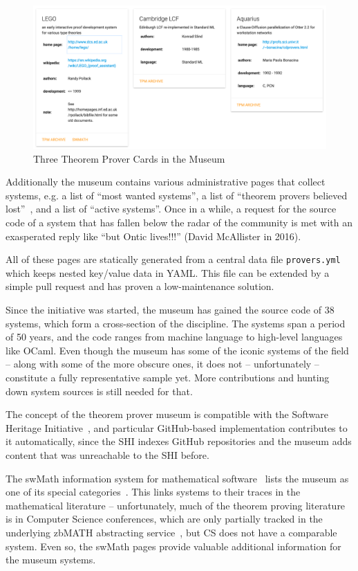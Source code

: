 \documentclass[smallcondensed]{svjour3}
\begin{document}
\begin{figure}[ht]\centering
  \includegraphics[width=\textwidth]{cards}
  \caption{Three Theorem Prover Cards in the Museum}\label{fig:cards}
\end{figure}

Additionally the museum contains various administrative pages that collect systems, e.g. a
list of ``most wanted systems'', a list of ``theorem provers believed
lost''~\cite{tpmuseum:tpbl:on}, and a list of ``active systems''. Once in a while, a
request for the source code of a system that has fallen below the radar of the community
is met with an exasperated reply like ``but Ontic lives!!!'' (David McAllister in
2016).

All of these pages are statically generated from a central data
file \texttt{provers.yml} \cite{tpmuseum:data:on} which keeps nested key/value data in
YAML. This file can be extended by a simple pull request and has proven a low-maintenance
solution. 
    
Since the initiative was started, the museum has gained the source code of 38 systems,
which form a cross-section of the discipline. The systems span a period of 50 years, and
the code ranges from machine language to high-level languages like OCaml. Even though the
museum has some of the iconic systems of the field -- along with some of the more obscure
ones, it does not -- unfortunately -- constitute a fully representative sample yet. More
contributions and hunting down system sources is still needed for that.

The concept of the theorem prover museum is compatible with the Software Heritage
Initiative~\cite{SoftwareHeritage:on}, and particular GitHub-based implementation
contributes to it automatically, since the SHI indexes GitHub repositories and the museum
adds content that was unreachable to the SHI before. 


The \textsf{swMath} information system for mathematical software~\cite{swMath:on} lists
the museum as one of its special categories~\cite{swMath:tpmuseum:on}. This links systems
to their traces in the mathematical literature -- unfortunately, much of the theorem
proving literature is in Computer Science conferences, which are only partially tracked in
the underlying \textsf{zbMATH} abstracting service~\cite{zbMATH:on}, but CS does not have
a comparable system. Even so, the \textsf{swMath} pages provide valuable additional
information for the museum systems. 
\end{document}
